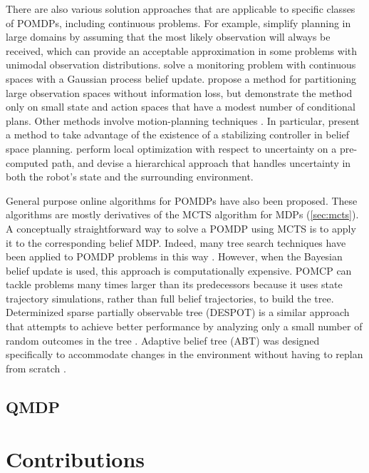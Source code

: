 There are also various solution approaches that are applicable to specific classes of POMDPs, including continuous problems.
For example, \citet{platt2010belief} simplify planning in large domains by assuming that the most likely observation will always be received, which can provide an acceptable approximation in some problems with unimodal observation distributions.
\citet{morere2016bayesian} solve a monitoring problem with continuous spaces with a Gaussian process belief update.
\citet{hoey2005solving} propose a method for partitioning large observation spaces without information loss, but demonstrate the method only on small state and action spaces that have a modest number of conditional plans.
Other methods involve motion-planning techniques \cite{melchior2007particle,prentice2009belief,bry2011rapidly}.
In particular, \citet{agha2011firm} present a method to take advantage of the existence of a stabilizing controller in belief space planning.
\citet{van2012motion} perform local optimization with respect to uncertainty on a pre-computed path, and \citet{indelman2015planning} devise a hierarchical approach that handles uncertainty in both the robot's state and the surrounding environment.

General purpose online algorithms for POMDPs have also been proposed.
These algorithms are mostly derivatives of the MCTS algorithm for MDPs (\cref{sec:mcts}).
A conceptually straightforward way to solve a POMDP using MCTS is to apply it to the corresponding belief MDP.
Indeed, many tree search techniques have been applied to POMDP problems in this way \cite{ross2008online}.
However, when the Bayesian belief update is used, this approach is computationally expensive.
POMCP can tackle problems many times larger than its predecessors because it uses state trajectory simulations, rather than full belief trajectories, to build the tree.
Determinized sparse partially observable tree (DESPOT) is a similar approach that attempts to achieve better performance by analyzing only a small number of random outcomes in the tree \cite{somani2013despot}.
Adaptive belief tree (ABT) was designed specifically to accommodate changes in the environment without having to replan from scratch \cite{kurniawati2016online}.


\subsection{QMDP} \label{sec:qmdp}


\section{Contributions}

